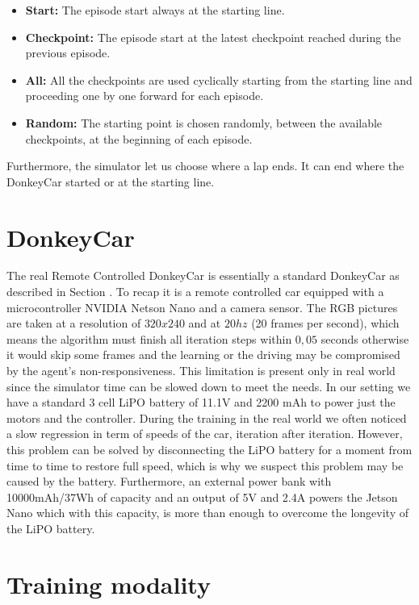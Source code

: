 \begin{itemize}
    \item \textbf{Start:} The episode start always at the starting line.
    \item \textbf{Checkpoint:} The episode start at the latest checkpoint reached during the previous episode.
    \item \textbf{All:} All the checkpoints are used cyclically starting from the starting line and proceeding one by one forward for each episode.
    \item \textbf{Random: } The starting point is chosen randomly, between the available checkpoints, at the beginning of each episode.
\end{itemize}
Furthermore, the simulator let us choose where a lap ends. It can end where the DonkeyCar started or at the starting line.


\section{DonkeyCar}

The real Remote Controlled DonkeyCar is essentially a standard DonkeyCar as described in Section \label{sec:donkeycar}. To recap it is a remote controlled car equipped with a microcontroller NVIDIA Netson Nano and a camera sensor. The RGB pictures are taken at a resolution of $320x240$ and at $20hz$ (20 frames per second), which means the algorithm must finish all iteration steps within $0,05$ seconds otherwise it would skip some frames and the learning or the driving may be compromised by the agent's non-responsiveness. This limitation is present only in real world since the simulator time can be slowed down to meet the needs. In our setting we have a standard 3 cell LiPO battery of 11.1V and 2200 mAh to power just the motors and the controller. During the training in the real world we often noticed a slow regression in term of speeds of the car, iteration after iteration. However, this problem can be solved by disconnecting the LiPO battery for a moment from time to time to restore full speed, which is why we suspect this problem may be caused by the battery. Furthermore, an external power bank with 10000mAh/37Wh of capacity and an output of 5V and 2.4A powers the Jetson Nano which with this capacity, is more than enough to overcome the longevity of the LiPO battery.

\section{Training modality}

